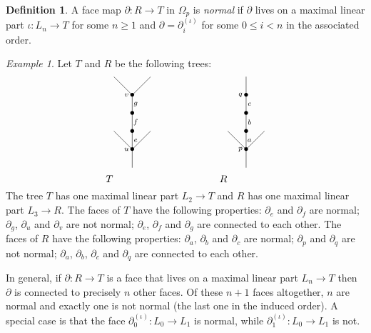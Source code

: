 \documentclass[a4paper]{amsart}
\theoremstyle{plain}
\theoremstyle{definition}
\newtheorem{dfn}[thm]{Definition}
\theoremstyle{remark}
\newtheorem{exa}[thm]{Example}
\newcommand{\rpd}{\Omega_p}
\newcommand{\To}{\longrightarrow}
\numberwithin{equation}{section}
\numberwithin{figure}{section}
\begin{document}
\begin{dfn}
A face map $\partial\colon R\longrightarrow T$ in $\rpd$ is \emph{normal} if $\partial$ lives on a maximal linear part
$\iota\colon L_n\longrightarrow T$ for some $n\ge 1$ and $\partial=\partial_i^{(\iota)}$ for some $0\le i<n$ in the associated order.
\end{dfn}

\begin{exa}
Let $T$ and $R$ be the following trees:
$$
\xy<0.08cm,0cm>:
(0,0)*{
\xy
(-10,-5)*{T};
(0,0)*=0{}="1";
(0,8)*=0{\bullet}="2";
(-8,16)*=0{}="3";
(0,16)*=0{\bullet}="4";
(8,16)*=0{}="5";
(0,24)*=0{\bullet}="6";
(0,32)*=0{\bullet}="7";
(-8,40)*=0{}="8";
(8,40)*=0{}="9";
(-2.5,32)*{\scriptstyle v};
(-2.5,8)*{\scriptstyle u};
(1.5,28)*{\scriptstyle g};
(1.5,20)*{\scriptstyle f};
(1.5,12)*{\scriptstyle e};
"1";"2" **\dir{-};
"2";"3" **\dir{-};
"2";"4" **\dir{-};
"2";"5" **\dir{-};
"4";"6" **\dir{-};
"6";"7" **\dir{-};
"7";"8" **\dir{-};
"7";"9" **\dir{-};
\endxy
};
(50,0)*{
\xy
(-10,-5)*{R};
(0,0)*=0{}="1";
(0,8)*=0{\bullet}="2";
(-8,16)*=0{}="3";
(0,16)*=0{\bullet}="4";
(8,16)*=0{}="5";
(0,24)*=0{\bullet}="6";
(0,32)*=0{\bullet}="7";
(0,40)*=0{}="8";
(-2.5,32)*{\scriptstyle q};
(-2.5,8)*{\scriptstyle p};
(1.5,28)*{\scriptstyle c};
(1.5,20)*{\scriptstyle b};
(1.5,12)*{\scriptstyle a};
"1";"2" **\dir{-};
"2";"3" **\dir{-};
"2";"4" **\dir{-};
"2";"5" **\dir{-};
"4";"6" **\dir{-};
"6";"7" **\dir{-};
"7";"8" **\dir{-};
\endxy
};
\endxy
$$
The tree $T$ has one maximal linear part $L_2\To T$ and $R$ has one maximal linear part $L_3\To R$.
The faces of $T$ have the following properties: $\partial_e$ and $\partial_f$ are normal; $\partial_g$, $\partial_u$ and $\partial_v$ are not normal; $\partial_e$, $\partial_f$ and $\partial_g$ are connected to each other. The faces of $R$ have the following properties: $\partial_a$, $\partial_b$ and $\partial_c$ are normal; $\partial_p$ and $\partial_q$ are not normal; $\partial_a$, $\partial_b$, $\partial_c$ and $\partial_q$ are connected to each other.
\end{exa}

In general, if $\partial\colon R\To T$ is a face that lives on a maximal linear part $L_n\To T$ then $\partial$ is connected to
precisely $n$ other faces. Of these $n+1$ faces altogether, $n$ are normal and exactly one is not normal (the last one in
the induced order). A special case is that the face $\partial^{(\iota)}_0\colon L_0\To L_1$ is normal, while $\partial^{(\iota)}_1\colon L_0\To L_1$ is
not.
\end{document}
